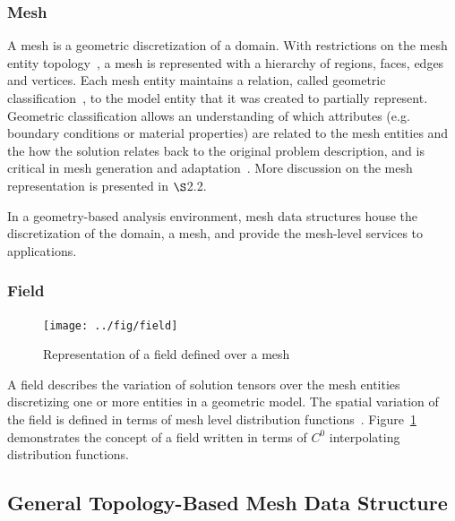 \subsubsection{Mesh}

A mesh is a geometric discretization of a domain. With restrictions on the mesh
entity topology~\cite{beall97}, a mesh is represented with a hierarchy of
regions, faces, edges and vertices. Each mesh entity maintains a relation, called
geometric classification~\cite{beall97, shephard00}, to the model entity that it was
created to partially represent. Geometric classification allows an understanding of which 
attributes (e.g. boundary conditions or material properties) are related to the 
mesh entities and the how the solution relates back to the original problem
description, and is critical in mesh generation and adaptation~\cite{beallthesis, beall97, shephard00}. More discussion on the mesh representation is presented in $\S$2.2. 


In a geometry-based analysis environment, mesh data structures house the
discretization of the domain, a mesh, and provide the mesh-level services to applications. 

\subsubsection{Field}

\begin{figure}
\centering
\texttt{[image: ../fig/field]}
\caption[Representation of a field defined over a mesh]{Representation of a field defined over a mesh~\cite{beallthesis}}
\label{fig:field}  %
\end{figure}

A field describes the variation of solution tensors over the mesh entities
discretizing one or more entities in a
geometric model. The spatial variation of the field is defined in terms of
mesh level distribution functions~\cite{beallthesis}.
Figure~\ref{fig:field} demonstrates the concept of a field written in terms of
$C^0$ interpolating distribution functions. 

\subsection{General Topology-Based Mesh Data Structure}\label{ch:genmdb}

